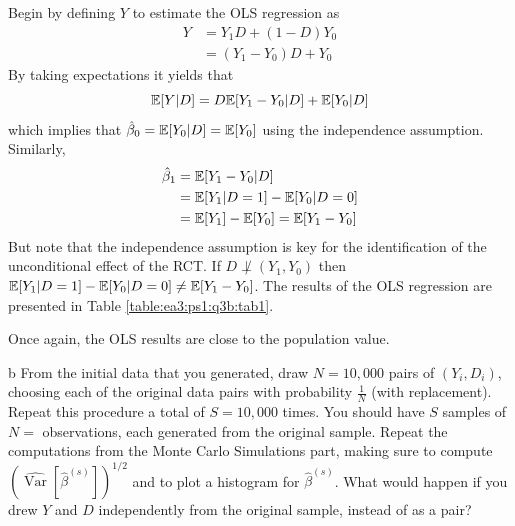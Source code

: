 \documentclass{article}
\begin{document}
\begin{solution}
Begin by defining $Y$ to estimate the OLS regression as 
\begin{align*}
    Y   &= Y_1D + (1-D)Y_0 \\ 
        &= (Y_1-Y_0)D + Y_0
\end{align*}
By taking expectations it yields that 
\begin{equation*}
    \mathbb{E}[Y\vert D] = D\mathbb{E}[Y_1-Y_0\vert D] + \mathbb{E}[Y_0\vert D]
\end{equation*}
which implies that $\hat{\beta}_0=\mathbb{E}[Y_0\vert D] = \mathbb{E}[Y_0]$ using the independence assumption. Similarly, 
\begin{align*}
\hat{\beta}_1 & =\mathbb{E}[Y_1-Y_0\vert D] \\
&= \mathbb{E}[Y_1\vert D=1] - \mathbb{E}[Y_0\vert D=0] \\ 
&= \mathbb{E}[Y_1]-\mathbb{E}[Y_0] = \mathbb{E}[Y_1-Y_0] 
\end{align*}
But note that the independence assumption is key for the identification of the unconditional effect of the RCT. If $D\not\perp (Y_1,Y_0)$ then $\mathbb{E}[Y_1\vert D=1] - \mathbb{E}[Y_0\vert D=0]\neq \mathbb{E}[Y_1-Y_0]$. The results of the OLS regression are presented in Table \ref{table:ea3:ps1:q3b:tab1}.
 
Once again, the OLS results are close to the population value. 
\end{solution}
\begin{problem}{b}
From the initial data that you generated, draw $N=10,000$ pairs of $\left(Y_{i}, D_{i}\right)$, choosing each of the original data pairs with probability $\frac{1}{N}$ (with replacement). Repeat this procedure a total of $S=10,000$ times. You should have $S$ samples of $N=$ observations, each generated from the original sample. Repeat the computations from the Monte Carlo Simulations part, making sure to compute $\left(\widehat{\operatorname{Var}}\left[\hat{\beta}^{(s)}\right]\right)^{1 / 2}$ and to plot a histogram for $\hat{\beta}^{(s)}$. What would happen if you drew $Y$ and $D$ independently from the original sample, instead of as a pair?
\end{problem}
\end{document}
